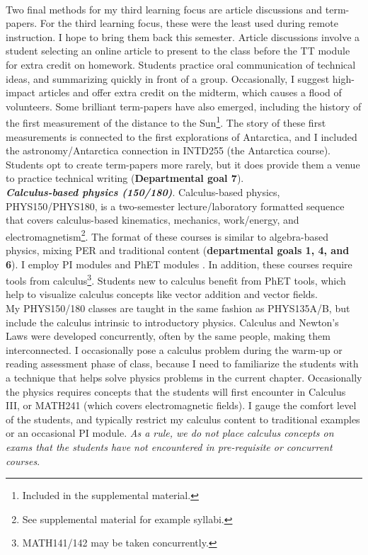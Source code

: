 \documentclass[../../../main.tex]{subfiles}
\begin{document}
\\
\vspace{0.25cm}
Two final methods for my third learning focus are article discussions and term-papers.  For the third learning focus, these were the least used during remote instruction.  I hope to bring them back this semester.  Article discussions involve a student selecting an online article to present to the class before the TT module for extra credit on homework.  Students practice oral communication of technical ideas, and summarizing quickly in front of a group.  Occasionally, I suggest high-impact articles and offer extra credit on the midterm, which causes a flood of volunteers.  Some brilliant term-papers have also emerged, including the history of the first measurement of the distance to the Sun\footnote{Included in the supplemental material.}.  The story of these first measurements is connected to the first explorations of Antarctica, and I included the astronomy/Antarctica connection in INTD255 (the Antarctica course).  Students opt to create term-papers more rarely, but it does provide them a venue to practice technical writing (\textbf{Departmental goal 7}).
\\
\vspace{0.25cm}
\textbf{\textit{Calculus-based physics (150/180)}}. Calculus-based physics, PHYS150/PHYS180, is a two-semester lecture/laboratory formatted sequence that covers calculus-based kinematics, mechanics, work/energy, and electromagnetism\footnote{See supplemental material for example syllabi.}.  The format of these courses is similar to algebra-based physics, mixing PER and traditional content (\textbf{departmental goals 1, 4, and 6}).  I employ PI modules \cite{mazur2013peer} and PhET modules \cite{phet}.  In addition, these courses require tools from calculus\footnote{MATH141/142 may be taken concurrently.}.  Students new to calculus benefit from PhET tools, which help to visualize calculus concepts like vector addition and vector fields.
\\
\vspace{0.25cm}
My PHYS150/180 classes are taught in the same fashion as PHYS135A/B, but include the calculus intrinsic to introductory physics.  Calculus and Newton's Laws were developed concurrently, often by the same people, making them interconnected.  I occasionally pose a calculus problem during the warm-up or reading assessment phase of class, because I need to familiarize the students with a technique that helps solve physics problems in the current chapter.  Occasionally the physics requires concepts that the students will first encounter in Calculus III, or MATH241 (which covers electromagnetic fields).  I gauge the comfort level of the students, and typically restrict my calculus content to traditional examples or an occasional PI module.  \textit{As a rule, we do not place calculus concepts on exams that the students have not encountered in pre-requisite or concurrent courses}.
\end{document}
